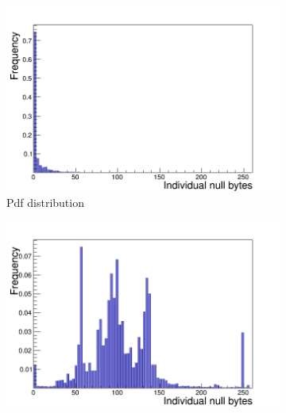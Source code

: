 \begin{figure}[!ht]
  \begin{subfigure}[b]{.5\linewidth}
    \raggedleft
     \includegraphics[scale=0.36]{figures/null_bytes/Indi_Null_Bytes_pdf}
   \caption{Pdf distribution}
    \label{fig:1a}
  \end{subfigure}%
  \begin{subfigure}[b]{.5\linewidth}
    \raggedright
        \includegraphics[scale=0.36]{figures/null_bytes/Indi_Null_Bytes_xls}
    \label{fig:1b}
  \end{subfigure}
  

\end{figure}
